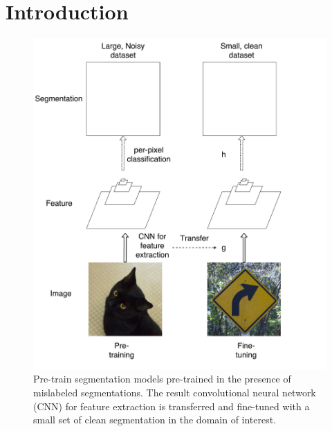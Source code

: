 \section{Introduction}
\label{introduction}




\begin{figure}[t]
\begin{center}
   \includegraphics[width=1.05\linewidth]{img/figure1}
\end{center}
   \caption{
   Pre-train segmentation models pre-trained in the presence of mislabeled segmentations.
   The result convolutional neural network (CNN) for feature extraction is transferred and fine-tuned with a small set of clean segmentation in the domain of interest.
   }
\label{fig:long}
\label{fig:onecol}
\end{figure}



